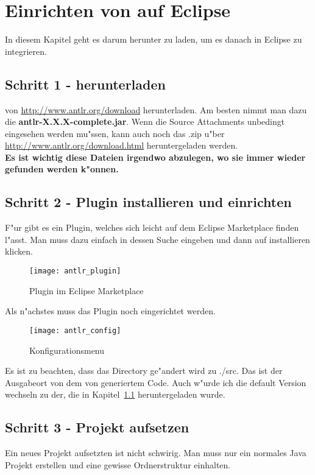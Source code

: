
\section{Einrichten von \antlr auf Eclipse}
In diesem Kapitel geht es darum \antlr herunter zu laden, um es danach in Eclipse zu integrieren. 

\subsection{Schritt 1 - \antlr herunterladen}
\label{sec:step1}
\antlr von \href{http://www.antlr.org/download}{http://www.antlr.org/download} herunterladen. Am besten nimmt man dazu die \textbf{antlr-X.X.X-complete.jar}. Wenn die Source Attachments unbedingt eingesehen werden mu"ssen, kann auch noch das .zip u"ber \href{http://www.antlr.org/download.html}{http://www.antlr.org/download.html} heruntergeladen werden.\\
\textbf{Es ist wichtig diese Dateien irgendwo abzulegen, wo sie immer wieder gefunden werden k"onnen.}

\subsection{Schritt 2 - \antlr Plugin installieren und einrichten}
F"ur \antlr gibt es ein Plugin, welches sich leicht auf dem Eclipse Marketplace finden l"asst. Man muss dazu einfach \antlr in dessen Suche eingeben und dann auf installieren klicken.

\begin{figure}[H]
	\centering
	\texttt{[image: antlr\_plugin]}
	\caption{\antlr Plugin im Eclipse Marketplace}
\end{figure}

Als n"achstes muss das Plugin noch eingerichtet werden. 

\begin{figure}[H]
	\centering
	\texttt{[image: antlr\_config]}
	\caption{\antlr Konfigurationsmenu}
\end{figure}

Es ist zu beachten, dass das Directory ge"andert wird zu ./src. Das ist der Ausgabeort von dem von \antlr generiertem Code. Auch w"urde ich die default Version wechseln zu der, die in Kapitel~\ref{sec:step1} heruntergeladen wurde. 

\subsection{Schritt 3 - Projekt aufsetzen}
Ein neues Projekt aufsetzten ist nicht schwirig. Man muss nur ein normales Java Projekt erstellen und eine gewisse Ordnerstruktur einhalten. 